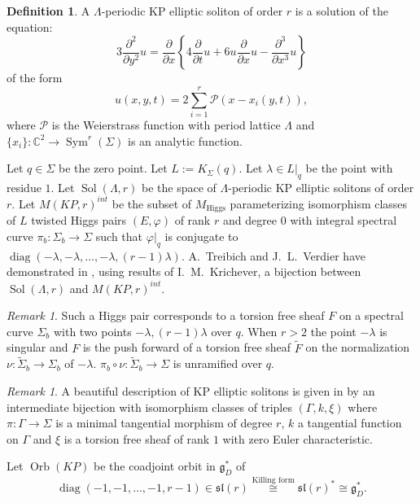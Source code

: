 \documentclass[12pt,a4paper,oneside,english]{smfart}
\theoremstyle{definition}
\newtheorem{defn}[thm]{Definition}
\theoremstyle{remark}
\newtheorem{rem}[thm]{Remark}
\DeclareMathOperator{\Sym}{Sym}
\DeclareMathOperator{\Sol}{Sol}
\DeclareMathOperator{\Orb}{Orb}
\DeclareMathOperator{\diag}{diag}
\newcommand{\Hig}{\mathrm{Higgs}}
\newcommand{\MH}{M_{\Hig}}
\begin{document}
\begin{defn}\label{t9.6}
A $\Lambda$-periodic KP elliptic soliton of order $r$ is a solution of the equation:
\[
3 \frac{\partial^2}{\partial y^2} u = \frac{\partial}{\partial x}\left\{ 4 \frac{\partial}{\partial t} u + 6u \frac{\partial}{\partial x} u - \frac{\partial^3}{\partial x^3} u \right\}
\]
of the form
\[
u(x, y, t) = 2 \sum_{i=1}^{r} \mathcal{P}(x - x_i(y, t)),
\]
where $\mathcal{P}$ is the Weierstrass function with period lattice $\Lambda$ and $\{x_i\} \colon \mathbb{C}^2 \to \Sym^r(\Sigma)$ is an analytic function.
\end{defn}

Let $q \in \Sigma$ be the zero point. Let $L := K_\Sigma(q)$. Let $\lambda \in L|_q$ be the point with residue $1$. Let $\Sol(\Lambda, r)$ be the space of $\Lambda$-periodic KP elliptic solitons of order $r$. Let $M(KP, r)^{int}$ be the subset of $\MH$ parameterizing isomorphism classes of $L$ twisted Higgs pairs $(E, \varphi)$ of rank $r$ and degree $0$ with integral spectral curve $\pi_b \colon \Sigma_b \to \Sigma$ such that $\varphi|_q$ is conjugate to $\diag(-\lambda, -\lambda, \ldots, -\lambda, (r-1)\lambda)$. A.~Treibich and J.~L.~Verdier have demonstrated in \cite{T-V}, using results of I.~M.~Krichever, a bijection between $\Sol(\Lambda, r)$ and $M(KP, r)^{int}$.

\begin{rem}\label{t9.7}
Such a Higgs pair corresponds to a torsion free sheaf $F$ on a spectral curve $\Sigma_b$ with two points $-\lambda, (r-1)\lambda$ over $q$. When $r > 2$ the point $-\lambda$ is singular and $F$ is the push forward of a torsion free sheaf $\tilde{F}$ on the normalization $\nu \colon \tilde{\Sigma}_b \to \Sigma_b$ of $-\lambda$. $\pi_b \circ \nu \colon \tilde{\Sigma}_b \to \Sigma$ is unramified over $q$.
\end{rem}

\begin{rem}\label{t9.8}
A beautiful description of KP elliptic solitons is given in \cite{T-V} by an intermediate bijection with isomorphism classes of triples $(\Gamma, k, \xi)$ where $\pi \colon \Gamma \to \Sigma$ is a minimal tangential morphism of degree $r$, $k$ a tangential function on $\Gamma$ and $\xi$ is a torsion free sheaf of rank $1$ with zero Euler characteristic.
\end{rem}

Let $\Orb(KP)$ be the coadjoint orbit in $\mathfrak{g}_D^*$ of
\[
\diag(-1, -1, \ldots, -1, r-1) \in \mathfrak{sl}(r) \overset{\text{Killing form}}{\cong} \mathfrak{sl}(r)^* \cong \mathfrak{g}_D^*.
\]
\end{document}
